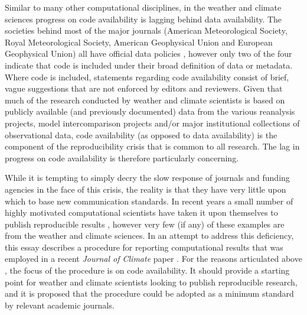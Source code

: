 Similar to many other computational disciplines, in the weather and climate sciences progress on code availability is lagging behind data availability. The societies behind most of the major journals (American Meteorological Society, Royal Meteorological Society, American Geophysical Union and European Geophysical Union) all have official data policies \citep[e.g.][]{Mayernik2015}, however only two of the four indicate that code is included under their broad definition of data or metadata. Where code is included, statements regarding code availability consist of brief, vague suggestions that are not enforced by editors and reviewers. Given that much of the research conducted by weather and climate scientists is based on publicly available (and previously documented) data from the various reanalysis projects, model intercomparison projects and/or major institutional collections of observational data, code availability (as opposed to data availability) is the component of the reproducibility crisis that is common to all research. The lag in progress on code availability is therefore particularly concerning. 

While it is tempting to simply decry the slow response of journals and funding agencies in the face of this crisis, the reality is that they have very little upon which to base new communication standards. In recent years a small number of highly motivated computational scientists have taken it upon themselves to publish reproducible results \citep[e.g.][]{Ketcheson2012,Crooks2014,Schmitt2015}, however very few (if any) of these examples are from the weather and climate sciences. In an attempt to address this deficiency, this essay describes a procedure for reporting computational results that was employed in a recent \textit{Journal of Climate} paper \citep[][hereafter referred to as IS2015]{IrvingSimmonds2015}. For the reasons articulated above \citep[and the fact that data availability has already been addressed in a recent BAMS essay;][]{Mayernik2015a}, the focus of the procedure is on code availability. It should provide a starting point for weather and climate scientists looking to publish reproducible research, and it is proposed that the procedure could be adopted as a minimum standard by relevant academic journals.
  
  
  
  
  
  
  
  
  
  
  